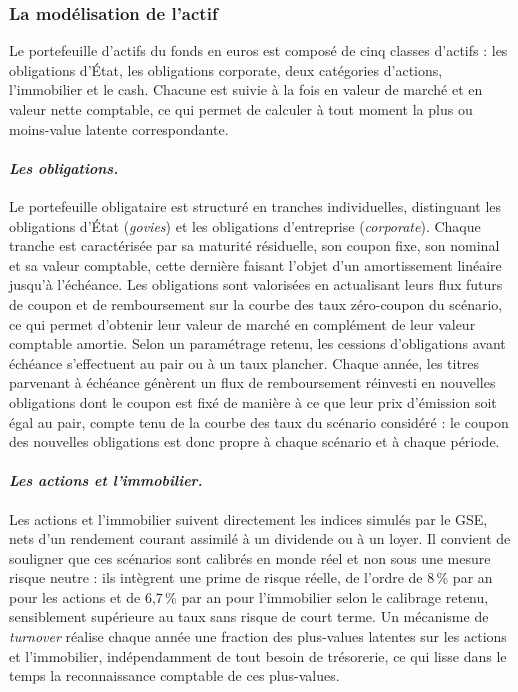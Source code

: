 \subsubsection{La modélisation de l'actif}

Le portefeuille d'actifs du fonds en euros est composé de cinq classes d'actifs : les obligations d'État, les obligations corporate, deux catégories d'actions, l'immobilier et le cash. Chacune est suivie à la fois en valeur de marché et en valeur nette comptable, ce qui permet de calculer à tout moment la plus ou moins-value latente correspondante.

\paragraph{\textit{Les obligations.}} \hfill\break
Le portefeuille obligataire est structuré en tranches individuelles, distinguant les obligations d'État (\textit{govies}) et les obligations d'entreprise (\textit{corporate}). Chaque tranche est caractérisée par sa maturité résiduelle, son coupon fixe, son nominal et sa valeur comptable, cette dernière faisant l'objet d'un amortissement linéaire jusqu'à l'échéance. Les obligations sont valorisées en actualisant leurs flux futurs de coupon et de remboursement sur la courbe des taux zéro-coupon du scénario, ce qui permet d'obtenir leur valeur de marché en complément de leur valeur comptable amortie. Selon un paramétrage retenu, les cessions d'obligations avant échéance s'effectuent au pair ou à un taux plancher. Chaque année, les titres parvenant à échéance génèrent un flux de remboursement réinvesti en nouvelles obligations dont le coupon est fixé de manière à ce que leur prix d'émission soit égal au pair, compte tenu de la courbe des taux du scénario considéré : le coupon des nouvelles obligations est donc propre à chaque scénario et à chaque période.

\paragraph{\textit{Les actions et l'immobilier.}} \hfill\break
Les actions et l'immobilier suivent directement les indices simulés par le GSE, nets d'un rendement courant assimilé à un dividende ou à un loyer. Il convient de souligner que ces scénarios sont calibrés en monde réel et non sous une mesure risque neutre : ils intègrent une prime de risque réelle, de l'ordre de 8\,\% par an pour les actions et de 6,7\,\% par an pour l'immobilier selon le calibrage retenu, sensiblement supérieure au taux sans risque de court terme. Un mécanisme de \textit{turnover} réalise chaque année une fraction des plus-values latentes sur les actions et l'immobilier, indépendamment de tout besoin de trésorerie, ce qui lisse dans le temps la reconnaissance comptable de ces plus-values.

